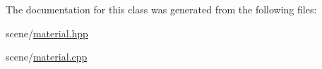 The documentation for this class was generated from the following files\+:\begin{DoxyCompactItemize}
\item 
scene/\hyperlink{material_8hpp}{material.\+hpp}\item 
scene/\hyperlink{material_8cpp}{material.\+cpp}\end{DoxyCompactItemize}
